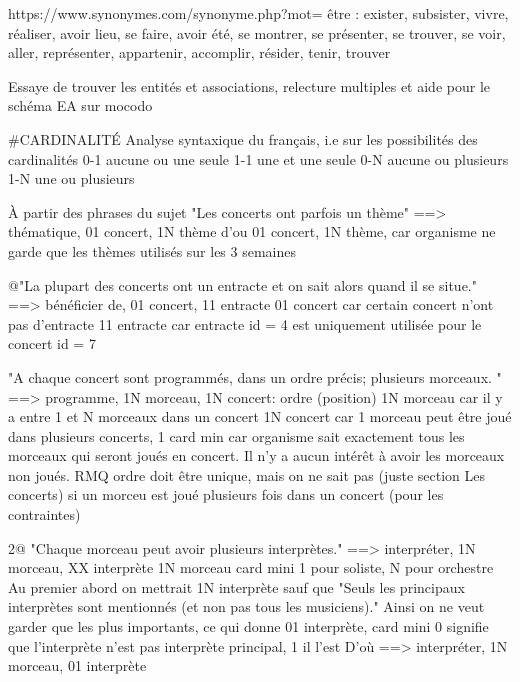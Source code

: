 \documentclass[12pt,a4paper]{article}
\begin{document}
{https://www.synonymes.com/synonyme.php?mot=%
être : 
exister, subsister, vivre, réaliser, avoir lieu, se faire, avoir été, se montrer, se présenter, se trouver, se voir, aller, représenter, appartenir, accomplir, résider, tenir, trouver



















Essaye de trouver les entités et associations, relecture multiples et aide pour le schéma EA sur mocodo



#CARDINALITÉ
Analyse syntaxique du français, i.e sur les possibilités des cardinalités
0-1     aucune ou une seule
1-1     une et une seule
0-N     aucune ou plusieurs
1-N     une ou plusieurs


À partir des phrases du sujet
"Les concerts ont parfois un thème" ==> thématique, 01 concert, 1N thème
d'ou 01 concert,
1N thème, car organisme ne garde que les thèmes utilisés sur les 3 semaines


@"La plupart des concerts ont un entracte et on sait alors quand il se situe."
==> bénéficier de, 01 concert, 11 entracte
01 concert car certain concert n'ont pas d'entracte
11 entracte car entracte id = 4 est uniquement utilisée pour le concert id = 7


"A chaque concert sont programmés, dans un ordre précis; plusieurs morceaux. "
==> programme, 1N morceau, 1N concert: ordre (position)
1N morceau car il y a entre 1 et N morceaux dans un concert
1N concert car 1 morceau peut être joué dans plusieurs concerts, 1 card min car organisme sait exactement
tous les morceaux qui seront joués en concert. Il n'y a aucun intérêt à avoir les morceaux non joués.
RMQ ordre doit être unique, mais on ne sait pas (juste section Les concerts) si un morceu est joué plusieurs fois dans un concert (pour les contraintes)



2@ "Chaque morceau peut avoir plusieurs interprètes."
==> interpréter, 1N morceau, XX interprète
1N morceau card mini 1 pour soliste, N pour orchestre
Au premier abord on mettrait 1N interprète sauf que
"Seuls les principaux interprètes sont mentionnés (et non pas tous les musiciens)."
Ainsi on ne veut garder que les plus importants, ce qui donne
01 interprète, card mini 0 signifie que l'interprète n'est pas interprète principal, 1 il l'est
D'où ==> interpréter, 1N morceau, 01 interprète



}
\end{document}
